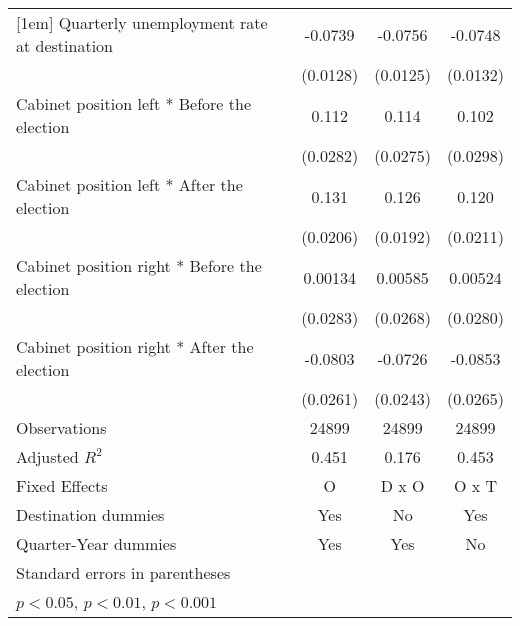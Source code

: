 \begin{table}[htbp]
\begin{tabular}{l*{3}{c}}
[1em]
Quarterly unemployment rate at destination&     -0.0739\sym{***}&     -0.0756\sym{***}&     -0.0748\sym{***}\\
                    &    (0.0128)         &    (0.0125)         &    (0.0132)         \\
[1em]
Cabinet position left * Before the election&       0.112\sym{***}&       0.114\sym{***}&       0.102\sym{**} \\
                    &    (0.0282)         &    (0.0275)         &    (0.0298)         \\
[1em]
Cabinet position left * After the election&       0.131\sym{***}&       0.126\sym{***}&       0.120\sym{***}\\
                    &    (0.0206)         &    (0.0192)         &    (0.0211)         \\
[1em]
Cabinet position right * Before the election&     0.00134         &     0.00585         &     0.00524         \\
                    &    (0.0283)         &    (0.0268)         &    (0.0280)         \\
[1em]
Cabinet position right * After the election&     -0.0803\sym{**} &     -0.0726\sym{**} &     -0.0853\sym{**} \\
                    &    (0.0261)         &    (0.0243)         &    (0.0265)         \\
\hline
Observations        &       24899         &       24899         &       24899         \\
Adjusted \(R^{2}\)  &       0.451         &       0.176         &       0.453         \\
Fixed Effects       &           O         &       D x O         &       O x T         \\
Destination dummies &         Yes         &          No         &         Yes         \\
Quarter-Year dummies&         Yes         &         Yes         &          No         \\
\hline\hline
\multicolumn{4}{l}{\footnotesize Standard errors in parentheses}\\
\multicolumn{4}{l}{\footnotesize \sym{*} \(p<0.05\), \sym{**} \(p<0.01\), \sym{***} \(p<0.001\)}\\
\end{tabular}
\end{table}
